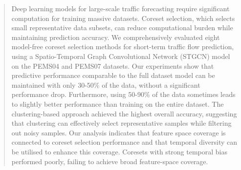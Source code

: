 \begin{abstract}
Deep learning models for large-scale traffic forecasting require significant computation for training massive datasets. Coreset selection, which selects small representative data subsets, can reduce computational burden while maintaining prediction accuracy. We comprehensively evaluated eight model-free coreset selection methods for short-term traffic flow prediction, using a Spatio-Temporal Graph Convolutional Network (STGCN) model on the PEMS04 and PEMS07 datasets. Our experiments show that predictive performance comparable to the full dataset model can be maintained with only 30-50\% of the data, without a significant performance drop. Furthermore, using 50-90\% of the data sometimes leads to slightly better performance than training on the entire dataset. The clustering-based approach achieved the highest overall accuracy, suggesting that clustering can effectively select representative samples while filtering out noisy samples. Our analysis indicates that feature space coverage is connected to coreset selection performance and that temporal diversity can be utilised to enhance this coverage. Coresets with strong temporal bias performed poorly, failing to achieve broad feature-space coverage.
\end{abstract}